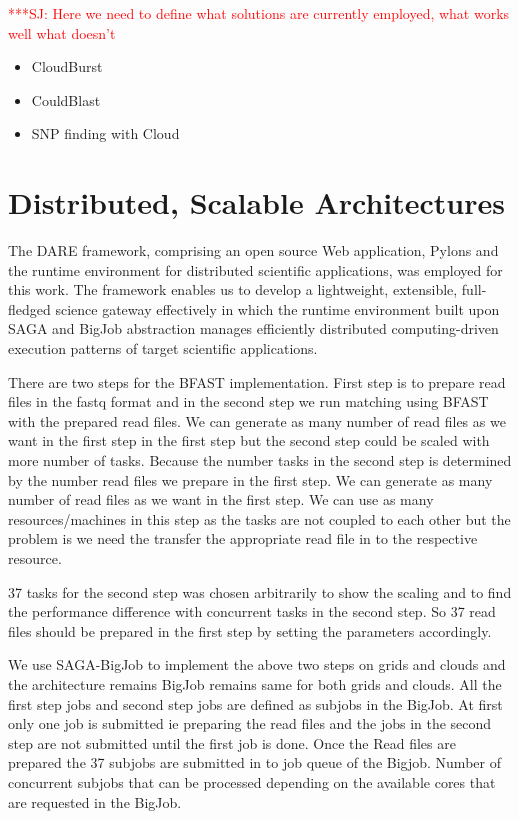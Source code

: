 \documentclass[12pt]{article}
\newcommand{\jhanote}[1]{ {\textcolor{red}     {***SJ: #1}}}
\newcommand{\jhanote}[1]{}
\begin{document}
\jhanote{Here we need to define what solutions are currently employed, what works well
  what doesn't}

\begin{itemize}
\item CloudBurst\cite{cloudburst}
\item CouldBlast\cite{cloudblast}
\item SNP finding with Cloud\cite{langmead2009}
\end{itemize}


\section{Distributed, Scalable Architectures}

The DARE framework, comprising an open source Web application, Pylons
and the runtime environment for distributed scientific applications,
was employed for this work.  The framework enables us to develop a
lightweight, extensible, full-fledged science gateway effectively in
which the runtime environment built upon SAGA and BigJob abstraction
manages efficiently distributed computing-driven execution patterns of
target scientific applications.

There are two steps for the BFAST implementation. First step is to prepare read files in the 
fastq format and in the second step we run matching using BFAST with the prepared read files.
 We can generate as many number of read files as we want in the first step in the first step
 but the second step could be scaled with more number of tasks. Because the number tasks 
 in the second step is determined by the number read files we prepare in the first step. We 
 can generate as many number of read files as we want in the first step. We can use as many resources/machines 
 in this step as the tasks are not coupled to each other but the problem is we need the transfer the appropriate read file
in to the respective resource.

37 tasks for the second step was chosen arbitrarily to show the scaling  and to find the performance 
difference with concurrent tasks in the second step. So 37 read files should be prepared in the
 first step by setting the parameters accordingly.

We use SAGA-BigJob to implement the above two steps on grids and clouds and 
the architecture remains BigJob remains same for both grids and clouds. All the first 
step jobs and second step jobs are defined as subjobs in the BigJob. At first only 
one job is submitted ie  preparing the read files and the jobs in the second step are not submitted
until the first job is done. Once the Read files are prepared the 37 subjobs are submitted in to 
job queue of the Bigjob. Number of concurrent subjobs that can be processed depending 
on the available cores that are requested in the BigJob.
  
\end{document}
